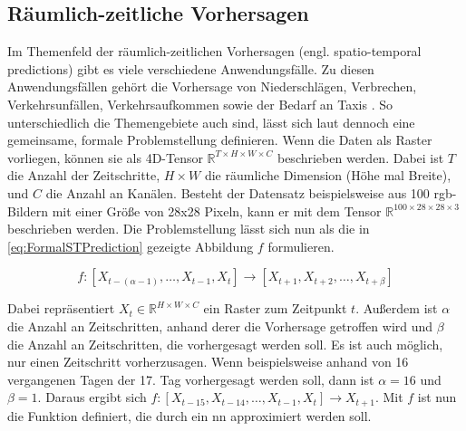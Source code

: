 \subsection{Räumlich-zeitliche Vorhersagen}
\label{sec:STPredictions}
Im Themenfeld der räumlich-zeitlichen Vorhersagen (engl. spatio-temporal predictions) gibt es viele verschiedene Anwendungsfälle.
Zu diesen Anwendungsfällen gehört die Vorhersage von Niederschlägen, Verbrechen, Verkehrsunfällen, Verkehrsaufkommen sowie der Bedarf an Taxis \cite{ConvLSTM,CrimeConvLSTM,CrimeSTResNet,HeteroConvLSTM,TrafficVolumeGraphDCRNN,STResNetOriginal}.
So unterschiedlich die Themengebiete auch sind, lässt sich laut \cite{DLTraff} dennoch eine gemeinsame, formale Problemstellung definieren.
Wenn die Daten als Raster vorliegen, können sie als 4D-Tensor $\mathbb{R}^{T \times H \times W \times C}$ beschrieben werden.
Dabei ist $T$ die Anzahl der Zeitschritte, $H \times W$ die räumliche Dimension (Höhe mal Breite), und $C$ die Anzahl an Kanälen.
Besteht der Datensatz beispielsweise aus 100 \acrshort{rgb}-Bildern mit einer Größe von 28x28 Pixeln, kann er mit dem Tensor $\mathbb{R}^{100 \times 28 \times 28 \times 3}$ beschrieben werden.
Die Problemstellung lässt sich nun als die in \autoref{eq:FormalSTPrediction} gezeigte Abbildung $f$ formulieren.

\begin{equation}
    f: [X_{t-(\alpha-1)}, \dots, X_{t-1}, X_t] \to [X_{t+1}, X_{t+2}, \dots, X_{t+\beta}]
\label{eq:FormalSTPrediction}
\end{equation}

Dabei repräsentiert $X_t \in \mathbb{R}^{H \times W \times C}$ ein Raster zum Zeitpunkt $t$.
Außerdem ist $\alpha$ die Anzahl an Zeitschritten, anhand derer die Vorhersage getroffen wird und $\beta$ die Anzahl an Zeitschritten, die vorhergesagt werden soll.
Es ist auch möglich, nur einen Zeitschritt vorherzusagen.
Wenn beispielsweise anhand von 16 vergangenen Tagen der 17. Tag vorhergesagt werden soll, dann ist $\alpha = 16$ und $\beta = 1$.
Daraus ergibt sich $f: [X_{t-15}, X_{t-14}, \dots, X_{t-1}, X_t] \to X_{t+1}$.
Mit $f$ ist nun die Funktion definiert, die durch ein \acrshort{nn} approximiert werden soll.


